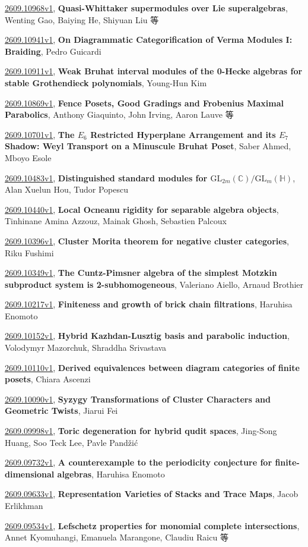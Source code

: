\documentclass[9pt, a4paper]{article}
\theoremstyle{plain}
\theoremstyle{definition}
\theoremstyle{remark}
\newcommand{\arxiv}[3]{\href{https://arxiv.org/abs/#1}{#1}, \textbf{\textcolor{arxivblue}{#2}}, #3}
\begin{document}
\arxiv{2609.10968v1}{Quasi-Whittaker supermodules over Lie superalgebras}{Wenting Gao, Baiying He, Shiyuan Liu 等}

\arxiv{2609.10941v1}{On Diagrammatic Categorification of Verma Modules I: Braiding}{Pedro Guicardi}

\arxiv{2609.10911v1}{Weak Bruhat interval modules of the 0-Hecke algebras for stable Grothendieck polynomials}{Young-Hun Kim}

\arxiv{2609.10869v1}{Fence Posets, Good Gradings and Frobenius Maximal Parabolics}{Anthony Giaquinto, John Irving, Aaron Lauve 等}

\arxiv{2609.10701v1}{The $E_6$ Restricted Hyperplane Arrangement and its $E_7$ Shadow: Weyl Transport on a Minuscule Bruhat Poset}{Saber Ahmed, Mboyo Esole}

\arxiv{2609.10483v1}{Distinguished standard modules for $\mathrm{GL}_{2m}(\mathbb{C})/\mathrm{GL}_m(\mathbb{H})$}{Alan Xuelun Hou, Tudor Popescu}

\arxiv{2609.10440v1}{Local Ocneanu rigidity for separable algebra objects}{Tinhinane Amina Azzouz, Mainak Ghosh, Sebastien Palcoux}

\arxiv{2609.10396v1}{Cluster Morita theorem for negative cluster categories}{Riku Fushimi}

\arxiv{2609.10349v1}{The Cuntz-Pimsner algebra of the simplest Motzkin subproduct system is 2-subhomogeneous}{Valeriano Aiello, Arnaud Brothier}

\arxiv{2609.10217v1}{Finiteness and growth of brick chain filtrations}{Haruhisa Enomoto}

\arxiv{2609.10152v1}{Hybrid Kazhdan-Lusztig basis and parabolic induction}{Volodymyr Mazorchuk, Shraddha Srivastava}

\arxiv{2609.10110v1}{Derived equivalences between diagram categories of finite posets}{Chiara Ascenzi}

\arxiv{2609.10090v1}{Syzygy Transformations of Cluster Characters and Geometric Twists}{Jiarui Fei}

\arxiv{2609.09998v1}{Toric degeneration for hybrid qudit spaces}{Jing-Song Huang, Soo Teck Lee, Pavle Pandžić}

\arxiv{2609.09732v1}{A counterexample to the periodicity conjecture for finite-dimensional algebras}{Haruhisa Enomoto}

\arxiv{2609.09633v1}{Representation Varieties of Stacks and Trace Maps}{Jacob Erlikhman}

\arxiv{2609.09534v1}{Lefschetz properties for monomial complete intersections}{Annet Kyomuhangi, Emanuela Marangone, Claudiu Raicu 等}
\end{document}
